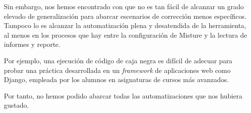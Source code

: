 Sin embargo, nos hemos encontrado con que no es tan fácil de alcanzar un grado elevado de generalización para abarcar escenarios de corrección menos específicos. Tampoco lo es alcanzar la automatización plena y desatendida de la herramienta, al menos en los procesos que hay entre la configuración de Misture y la  lectura de informes y reporte.

Por ejemplo, una ejecución de código de caja negra es difícil de adecuar para probar una práctica desarrollada en un \textit{framework} de aplicaciones web como Django, empleada por los alumnos en asignaturas de cursos más avanzados.

Por tanto, no hemos podido abarcar todas las automatizaciones que nos hubiera gustado.


